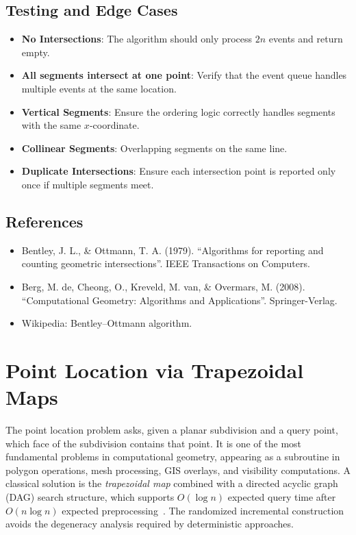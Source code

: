 \subsection{Testing and Edge Cases}

\begin{itemize}
\item \textbf{No Intersections}: The algorithm should only process $2n$ events and return empty.
\item \textbf{All segments intersect at one point}: Verify that the event queue handles multiple events at the same location.
\item \textbf{Vertical Segments}: Ensure the ordering logic correctly handles segments with the same $x$-coordinate.
\item \textbf{Collinear Segments}: Overlapping segments on the same line.
\item \textbf{Duplicate Intersections}: Ensure each intersection point is reported only once if multiple segments meet.
\end{itemize}

\subsection{References}

\begin{itemize}
\item Bentley, J. L., \& Ottmann, T. A. (1979). ``Algorithms for reporting and counting geometric intersections''. IEEE Transactions on Computers.
\item Berg, M. de, Cheong, O., Kreveld, M. van, \& Overmars, M. (2008). ``Computational Geometry: Algorithms and Applications''. Springer-Verlag.
\item Wikipedia: Bentley--Ottmann algorithm.
\end{itemize}


\section{Point Location via Trapezoidal Maps}
\label{sec:point_location_trapezoidal}

The point location problem asks, given a planar subdivision and a query point, which face of the subdivision contains that point. It is one of the most fundamental problems in computational geometry, appearing as a subroutine in polygon operations, mesh processing, GIS overlays, and visibility computations. A classical solution is the \emph{trapezoidal map} combined with a directed acyclic graph (DAG) search structure, which supports $O(\log n)$ expected query time after $O(n \log n)$ expected preprocessing~\cite{mulmuley1990, seidel1991}. The randomized incremental construction avoids the degeneracy analysis required by deterministic approaches.

